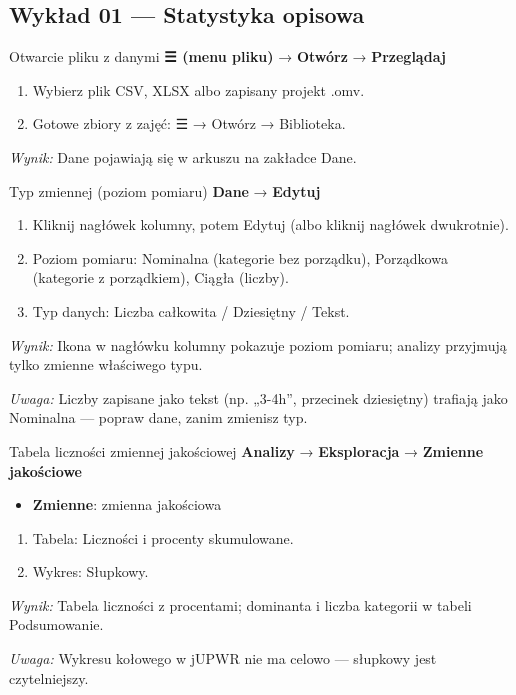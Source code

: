 \documentclass[
  polish,
  10pt,
  a4paper,
  DIV=11,
  numbers=noendperiod]{scrartcl}
\newcommand{\jmenu}[1]{{\color{upwraccent}\small #1}}
\begin{document}

\subsection{Wykład 01 --- Statystyka
opisowa}\label{wykux142ad-01-statystyka-opisowa}

\begin{jbox}{Otwarcie pliku z danymi}\label{w:otworz-plik}
\jmenu{\textbf{{\symfont ☰} (menu pliku)} → \textbf{Otwórz} → \textbf{Przeglądaj}}

\begin{enumerate}
\item Wybierz plik CSV, XLSX albo zapisany projekt .omv.
\item Gotowe zbiory z zajęć: {\symfont ☰} → Otwórz → Biblioteka.
\end{enumerate}
\textit{Wynik:} Dane pojawiają się w arkuszu na zakładce Dane.

\end{jbox}

\begin{jbox}{Typ zmiennej (poziom pomiaru)}\label{w:poziom-pomiaru}
\jmenu{\textbf{Dane} → \textbf{Edytuj}}

\begin{enumerate}
\item Kliknij nagłówek kolumny, potem Edytuj (albo kliknij nagłówek dwukrotnie).
\item Poziom pomiaru: Nominalna (kategorie bez porządku), Porządkowa (kategorie z porządkiem), Ciągła (liczby).
\item Typ danych: Liczba całkowita / Dziesiętny / Tekst.
\end{enumerate}
\textit{Wynik:} Ikona w nagłówku kolumny pokazuje poziom pomiaru; analizy przyjmują tylko zmienne właściwego typu.

{\color{upwrsoft}\small\textit{Uwaga:} Liczby zapisane jako tekst (np. „3-4h”, przecinek dziesiętny) trafiają jako Nominalna — popraw dane, zanim zmienisz typ.}
\end{jbox}

\begin{jbox}{Tabela liczności zmiennej jakościowej}\label{w:tabela-licznosci}
\jmenu{\textbf{Analizy} → \textbf{Eksploracja} → \textbf{Zmienne jakościowe}}

\begin{itemize}
\item[$\triangleright$] \textbf{Zmienne}: zmienna jakościowa
\end{itemize}
\begin{enumerate}
\item Tabela: Liczności i procenty skumulowane.
\item Wykres: Słupkowy.
\end{enumerate}
\textit{Wynik:} Tabela liczności z procentami; dominanta i liczba kategorii w tabeli Podsumowanie.

{\color{upwrsoft}\small\textit{Uwaga:} Wykresu kołowego w jUPWR nie ma celowo — słupkowy jest czytelniejszy.}
\end{jbox}
\end{document}
